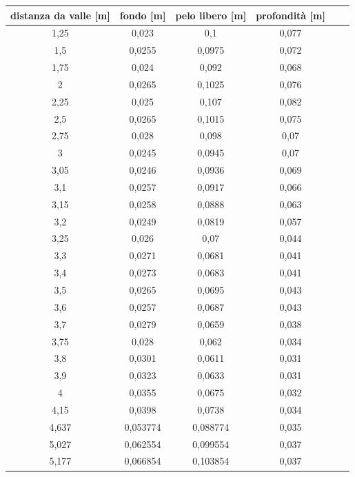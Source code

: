\documentclass[12pt]{article} %
\begin{document}
\newpage
\vspace*{\fill}
\begin{table}[H]
\scriptsize\sffamily
\centering
\begin{tabular}{cccccc}
\hline
\textbf{distanza da valle {[}m{]}}  & \textbf{fondo {[}m{]}}              & \textbf{pelo libero {[}m{]}}        & \textbf{profondità {[}m{]}}         &  &  \\\hline
1,25   & 0,023    & 0,1      & 0,077 &  &  \\
1,5    & 0,0255   & 0,0975   & 0,072 &  &  \\
1,75   & 0,024    & 0,092    & 0,068 &  &  \\
2      & 0,0265   & 0,1025   & 0,076 &  &  \\
2,25   & 0,025    & 0,107    & 0,082 &  &  \\
2,5    & 0,0265   & 0,1015   & 0,075 &  &  \\
2,75   & 0,028    & 0,098    & 0,07  &  &  \\
3      & 0,0245   & 0,0945   & 0,07  &  &  \\
3,05   & 0,0246   & 0,0936   & 0,069 &  &  \\
3,1    & 0,0257   & 0,0917   & 0,066 &  &  \\
3,15   & 0,0258   & 0,0888   & 0,063 &  &  \\
3,2    & 0,0249   & 0,0819   & 0,057 &  &  \\
3,25   & 0,026    & 0,07     & 0,044 &  &  \\
3,3    & 0,0271   & 0,0681   & 0,041 &  &  \\
3,4    & 0,0273   & 0,0683   & 0,041 &  &  \\
3,5    & 0,0265   & 0,0695   & 0,043 &  &  \\
3,6    & 0,0257   & 0,0687   & 0,043 &  &  \\
3,7    & 0,0279   & 0,0659   & 0,038 &  &  \\
3,75   & 0,028    & 0,062    & 0,034 &  &  \\
3,8    & 0,0301   & 0,0611   & 0,031 &  &  \\
3,9    & 0,0323   & 0,0633   & 0,031 &  &  \\
4      & 0,0355   & 0,0675   & 0,032 &  &  \\
4,15   & 0,0398   & 0,0738   & 0,034 &  &  \\
4,637  & 0,053774 & 0,088774 & 0,035 &  &  \\
5,027  & 0,062554 & 0,099554 & 0,037 &  &  \\
5,177  & 0,066854 & 0,103854 & 0,037 &  &  \\

\end{tabular}
\end{table}
\end{document}
